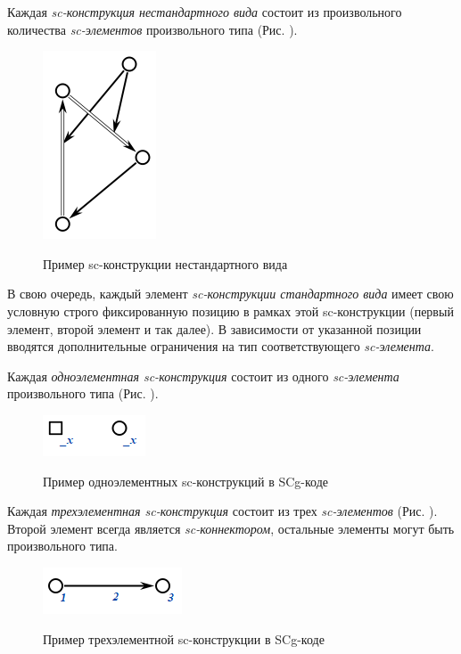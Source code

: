 Каждая \textit{sc-конструкция нестандартного вида} состоит из произвольного количества \textit{sc-элементов} произвольного типа (Рис. \textit{}).

\begin{figure}[H]
	\centering
	\caption{Пример sc-конструкции нестандартного вида}
	\includegraphics[scale=0.8]{images/part3/chapter_situation_management/pic_ps1.png}
	\label{fig:pic_ps1}
\end{figure}

В свою очередь, каждый элемент \textit{\mbox{sc-конструкции} стандартного вида} имеет свою условную строго фиксированную позицию в рамках этой \mbox{sc-конструкции} (первый элемент, второй элемент и так далее). В зависимости от указанной позиции вводятся дополнительные ограничения на тип соответствующего \textit{sc-элемента}.

Каждая \textit{одноэлементная sc-конструкция} состоит из одного \textit{sc-элемента} произвольного типа (Рис. \textit{}).

\begin{figure}[H]
	\centering
	\caption{Пример одноэлементных sc-конструкций в SCg-коде}
	\includegraphics[scale=0.8]{images/part3/chapter_situation_management/pic_ps2.png}
	\label{fig:pic_ps2}
\end{figure}

Каждая \textit{трехэлементная sc-конструкция} состоит из трех \textit{sc-элементов} (Рис. \textit{}). Второй элемент всегда является \textit{sc-коннектором}, остальные элементы могут быть произвольного типа.

\begin{figure}[H]
	\centering
	\caption{Пример трехэлементной sc-конструкции в SCg-коде}
	\includegraphics[scale=0.8]{images/part3/chapter_situation_management/pic_ps3.png}
	\label{fig:pic_ps3}
\end{figure}

